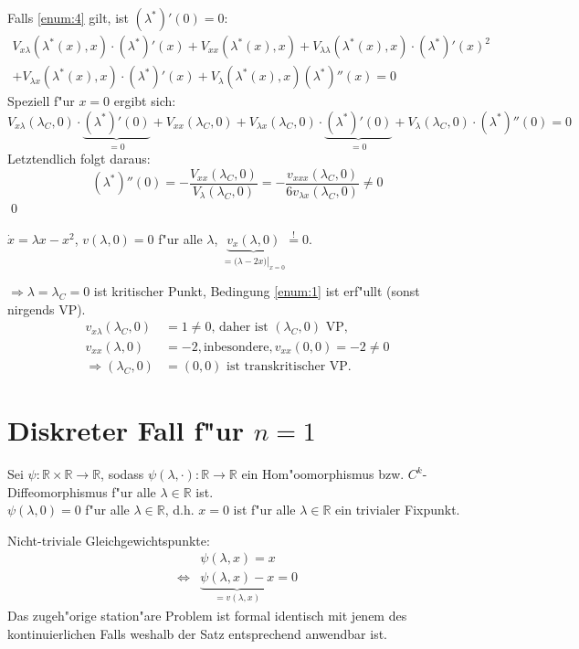 \documentclass[a4paper, 13pt]{scrreprt}
\theoremstyle{definition} \newtheorem{definition}{Definition}[section]
\newenvironment{beweis}[1][Beweis]{\begin{trivlist}
\item[\hskip \labelsep {\bfseries #1}]}{\end{trivlist}}
\newenvironment{beispiel}[1][Beispiel]{\begin{trivlist}
\item[\hskip \labelsep {\bfseries #1}]}{\end{trivlist}}
\newcommand{\RR}{\mathbb{R}}
\begin{document}
\begin{beweis}
Falls \ref{enum:4} gilt, ist $(\lambda^*)'(0) = 0$:
\begin{align*}
V_{x\lambda}(\lambda^*(x),x)\cdot(\lambda^*)'(x) + V_{xx}(\lambda^*(x),x) + V_{\lambda\lambda}(\lambda^*(x),x)\cdot(\lambda^*)'(x)^2\\
 + V_{\lambda x}(\lambda^*(x),x)\cdot(\lambda^*)'(x) + V_\lambda(\lambda^*(x),x)(\lambda^*)''(x) = 0
\end{align*}
Speziell f"ur $x =0$ ergibt sich:
\[
V_{x\lambda}(\lambda_C,0)\cdot\underbrace{(\lambda^*)'(0)}_{= 0} + V_{xx}(\lambda_C,0) + V_{\lambda x}(\lambda_C,0)\cdot\underbrace{(\lambda^*)'(0)}_{= 0} + V_\lambda(\lambda_C,0)\cdot(\lambda^*)''(0)=0
\]
Letztendlich folgt daraus:
\[
(\lambda^*)''(0) = -\frac{V_{xx}(\lambda_C,0)}{V_\lambda(\lambda_C,0)} = -\frac{v_{xxx}(\lambda_C,0)}{6v_{\lambda x}(\lambda_C,0)}\neq 0
\]\qed
\end{beweis}

\begin{beispiel}
$\dot x = \lambda x - x^2$, $v(\lambda,0) = 0$ f"ur alle $\lambda$, $\underbrace{v_x(\lambda,0)}_{= (\left.\lambda - 2x)\right|_{x = 0}}\stackrel{!}{=}0$.

$\Rightarrow\lambda = \lambda_C = 0$  ist kritischer Punkt, Bedingung \ref{enum:1} ist erf"ullt (sonst nirgends VP).
\begin{align*}
v_{x\lambda}(\lambda_C,0) &= 1\neq 0\text{, daher ist } (\lambda_C,0)\text{ VP,}\\
v_{xx}(\lambda,0) &= -2,\text{inbesondere},v_{xx}(0,0) = -2\neq 0 \\
\Rightarrow(\lambda_C,0) &= (0,0)\text{ ist transkritischer VP.}
\end{align*}
\end{beispiel}

\section{Diskreter Fall f"ur $n=1$}
Sei $\psi\colon\RR\times\RR\to\RR$, sodass $\psi(\lambda,\cdot)\colon\RR\to\RR$ ein Hom"oomorphismus bzw. $C^k$-Diffeomorphismus f"ur alle $\lambda \in \RR$ ist.
\\
$\psi(\lambda,0) = 0$ f"ur alle $\lambda\in\RR$, d.h. $x = 0$ ist f"ur alle $\lambda\in\RR$ ein trivialer Fixpunkt.

Nicht-triviale Gleichgewichtspunkte: 
\begin{align*}
&\psi(\lambda,x)=x\\
\Leftrightarrow &\underbrace{\psi(\lambda,x)-x}_{= v(\lambda,x)} = 0
\end{align*}
Das zugeh"orige station"are Problem ist formal identisch mit jenem des kontinuierlichen Falls weshalb der Satz entsprechend anwendbar ist.
\end{document}
